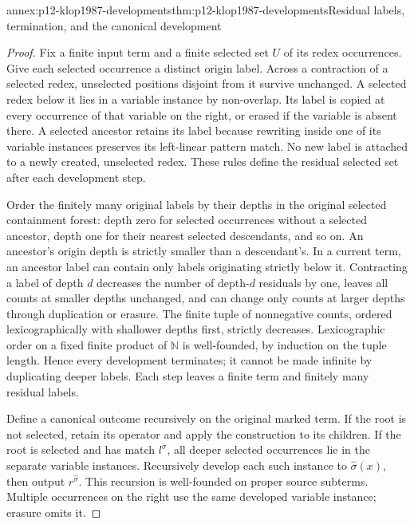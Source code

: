 \begin{annexitem}{annex:p12-klop1987-developments}{thm:p12-klop1987-developments}{Residual labels, termination, and the canonical development}
\begin{proof}
Fix a finite input term and a finite selected set \(U\) of its redex
occurrences. Give each selected occurrence a distinct origin label.
Across a contraction of a selected redex, unselected positions disjoint
from it survive unchanged. A selected redex below it lies in a variable
instance by non-overlap. Its label is copied at every occurrence of that
variable on the right, or erased if the variable is absent there.
A selected ancestor retains its label because rewriting inside one of
its variable instances preserves its left-linear pattern match. No new
label is attached to a newly created, unselected redex. These rules define
the residual selected set after each development step.

Order the finitely many original labels by their depths in the original
selected containment forest: depth zero for selected occurrences without
a selected ancestor, depth one for their nearest selected descendants,
and so on. An ancestor's origin depth is strictly smaller than a
descendant's. In a current term, an ancestor label can contain only
labels originating strictly below it. Contracting a label of depth
\(d\) decreases the number of depth-\(d\) residuals by one, leaves
all counts at smaller depths unchanged, and can change only counts at
larger depths through duplication or erasure. The finite tuple of
nonnegative counts, ordered lexicographically with shallower depths
first, strictly decreases. Lexicographic order on a fixed finite product
of \(\mathbb N\) is well-founded, by induction on the tuple length.
Hence every development terminates; it cannot be made infinite by
duplicating deeper labels. Each step leaves a finite term and finitely
many residual labels.

Define a canonical outcome recursively on the original marked term.
If the root is not selected, retain its operator and apply the construction
to its children. If the root is selected and has match \(l^\sigma\),
all deeper selected occurrences lie in the separate variable instances.
Recursively develop each such instance to \(\widehat\sigma(x)\),
then output \(r^{\widehat\sigma}\). This recursion is well-founded
on proper source subterms. Multiple occurrences on the right use the
same developed variable instance; erasure omits it.


\end{proof}
\end{annexitem}
